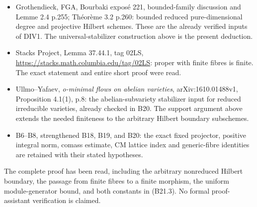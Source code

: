 \begin{itemize}
\tightlist
\item
  Grothendieck, FGA, Bourbaki exposé 221, bounded-family discussion and Lemme 2.4 p.255; Théorème 3.2 p.260: bounded reduced pure-dimensional degree and projective Hilbert schemes. These are the already verified inputs of DIV1. The universal-stabilizer construction above is the present deduction.
\item
  Stacks Project, Lemma 37.44.1, tag 02LS, \url{https://stacks.math.columbia.edu/tag/02LS}: proper with finite fibres is finite. The exact statement and entire short proof were read.
\item
  Ullmo--Yafaev, \emph{o-minimal flows on abelian varieties}, arXiv:1610.01488v1, Proposition 4.1(1), p.8: the abelian-subvariety stabilizer input for reduced irreducible varieties, already checked in B20. The support argument above extends the needed finiteness to the arbitrary Hilbert boundary subschemes.
\item
  B6--B8, strengthened B18, B19, and B20: the exact fixed projector, positive integral norm, comass estimate, CM lattice index and generic-fibre identities are retained with their stated hypotheses.
\end{itemize}

The complete proof has been read, including the arbitrary nonreduced Hilbert boundary, the passage from finite fibres to a finite morphism, the uniform module-generator bound, and both constants in (B21.3). No formal proof-assistant verification is claimed.
